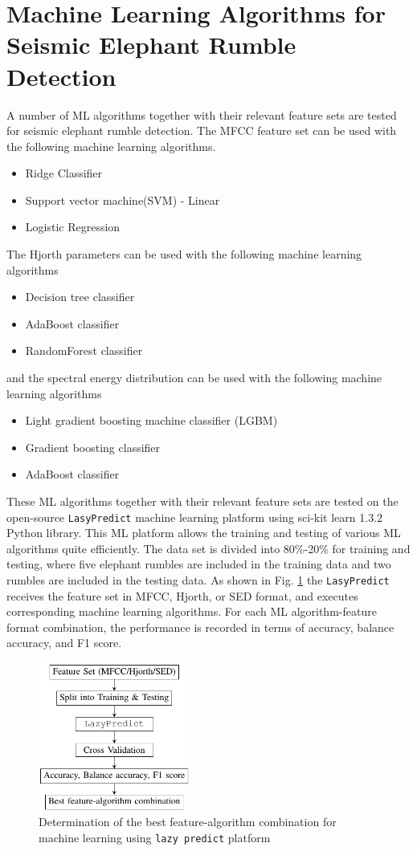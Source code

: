 \documentclass[applsci,article,accept,moreauthors,pdftex]{Definitions/mdpi}
\begin{document}
\section{Machine Learning Algorithms for Seismic Elephant Rumble Detection}
A number of ML algorithms together with their relevant feature sets are tested for seismic elephant rumble detection. The MFCC feature set can be used with the following machine learning algorithms.
\begin{itemize}
	\item{Ridge Classifier}
	\item{Support vector machine(SVM) - Linear}
	\item{Logistic Regression}
\end{itemize}
The Hjorth parameters can be used with the following machine learning algorithms
\begin{itemize}
	\item{Decision tree classifier}
	\item{AdaBoost classifier}
	\item{RandomForest classifier}
\end{itemize}
and the spectral energy distribution can be used with the following machine learning algorithms
\begin{itemize}
	\item{Light gradient boosting machine classifier (LGBM)}
	\item{Gradient boosting classifier}
	\item{AdaBoost classifier}
\end{itemize}
These ML algorithms together with their relevant feature sets are tested on the open-source {\tt LasyPredict} machine learning platform using sci-kit learn 1.3.2 \cite{scikit-learn} Python library. This ML platform allows the training and testing of various ML algorithms quite efficiently. The data set is divided into 80\%-20\% for training and testing, where five elephant rumbles are included in the training data and two rumbles are included in the testing data. As shown in Fig. \ref{fig_ML} the {\tt LasyPredict} receives the feature set in MFCC, Hjorth, or SED format, and executes corresponding machine learning algorithms. For each ML algorithm-feature format combination, the performance is recorded in terms of accuracy, balance accuracy, and F1 score.
\begin{figure}[h]
	\centering   \includegraphics[width=5cm]{figures/algo}
	\caption{Determination of the best feature-algorithm combination for machine learning using {\tt lazy predict} platform}
	\label{fig_ML}
\end{figure}
\end{document}
